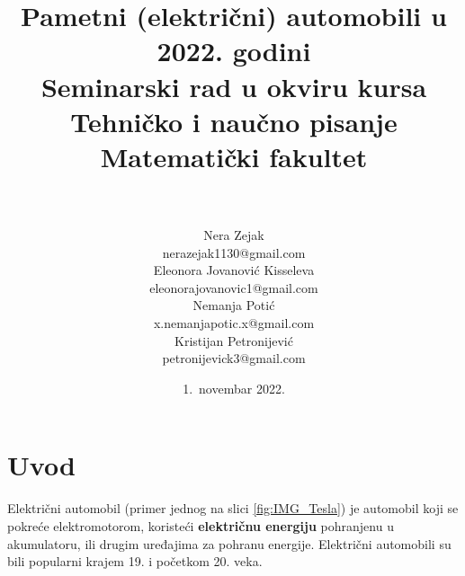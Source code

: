 \documentclass[a4paper]{article}
\begin{document}
\title{Pametni (električni) automobili u 2022. godini\vspace{3ex}\\ \small{Seminarski rad u okviru kursa\\Tehničko i naučno pisanje\\ Matematički fakultet}}

\author{\\\\Nera Zejak\\\footnotesize {nerazejak1130@gmail.com}\\Eleonora Jovanović Kisseleva\\\footnotesize {eleonorajovanovic1@gmail.com}\\Nemanja Potić\\\footnotesize {x.nemanjapotic.x@gmail.com}\\Kristijan Petronijević\\\footnotesize {petronijevick3@gmail.com}\\}
\date{1.~novembar 2022.}
\maketitle



\tableofcontents

\newpage

\section{Uvod}
   Električni automobil (primer jednog na slici \ref{fig:IMG_Tesla}) je automobil koji se pokreće elektromotorom, koristeći \textbf{električnu energiju} pohranjenu u akumulatoru, ili drugim uređajima za pohranu energije. Električni automobili su bili popularni krajem 19. i početkom 20. veka. 
        
\end{document}

